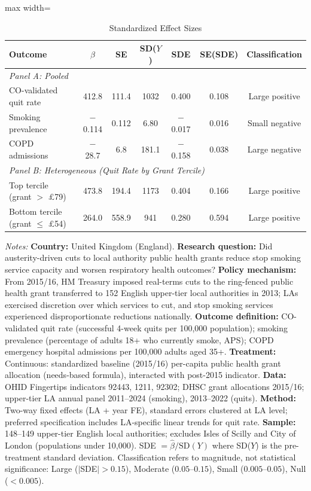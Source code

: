 \begin{table}[t]
\centering
\caption{Standardized Effect Sizes}
\label{tab:sde}
\begin{adjustbox}{max width=\textwidth}
\begin{tabular}{lcccccc}
\hline\hline
Outcome & $\hat{\beta}$ & SE & SD($Y$) & SDE & SE(SDE) & Classification \\
\hline
\multicolumn{7}{l}{\textit{Panel A: Pooled}} \\
CO-validated quit rate & 412.8 & 111.4 & 1032 & 0.400 & 0.108 & Large positive \\
Smoking prevalence & $-$0.114 & 0.112 & 6.80 & $-$0.017 & 0.016 & Small negative \\
COPD admissions & $-$28.7 & 6.8 & 181.1 & $-$0.158 & 0.038 & Large negative \\
\hline
\multicolumn{7}{l}{\textit{Panel B: Heterogeneous (Quit Rate by Grant Tercile)}} \\
Top tercile (grant $>$ \pounds79) & 473.8 & 194.4 & 1173 & 0.404 & 0.166 & Large positive \\
Bottom tercile (grant $\leq$ \pounds54) & 264.0 & 558.9 & 941 & 0.280 & 0.594 & Large positive \\
\hline\hline
\end{tabular}
\end{adjustbox}
\begin{tablenotes}
\footnotesize
\item \textit{Notes:} \textbf{Country:} United Kingdom (England). \textbf{Research question:} Did austerity-driven cuts to local authority public health grants reduce stop smoking service capacity and worsen respiratory health outcomes? \textbf{Policy mechanism:} From 2015/16, HM Treasury imposed real-terms cuts to the ring-fenced public health grant transferred to 152 English upper-tier local authorities in 2013; LAs exercised discretion over which services to cut, and stop smoking services experienced disproportionate reductions nationally. \textbf{Outcome definition:} CO-validated quit rate (successful 4-week quits per 100,000 population); smoking prevalence (percentage of adults 18+ who currently smoke, APS); COPD emergency hospital admissions per 100,000 adults aged 35+. \textbf{Treatment:} Continuous: standardized baseline (2015/16) per-capita public health grant allocation (needs-based formula), interacted with post-2015 indicator. \textbf{Data:} OHID Fingertips indicators 92443, 1211, 92302; DHSC grant allocations 2015/16; upper-tier LA annual panel 2011--2024 (smoking), 2013--2022 (quits). \textbf{Method:} Two-way fixed effects (LA + year FE), standard errors clustered at LA level; preferred specification includes LA-specific linear trends for quit rate. \textbf{Sample:} 148--149 upper-tier English local authorities; excludes Isles of Scilly and City of London (populations under 10,000). SDE $= \hat{\beta} / \text{SD}(Y)$ where SD($Y$) is the pre-treatment standard deviation. Classification refers to magnitude, not statistical significance: Large ($|$SDE$| > 0.15$), Moderate ($0.05$--$0.15$), Small ($0.005$--$0.05$), Null ($< 0.005$).
\end{tablenotes}
\end{table}
